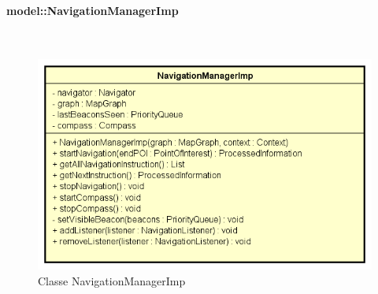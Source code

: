 \documentclass[../DefinizioneDiProdotto.tex]{subfiles}
\begin{document}
\paragraph{model::NavigationManagerImp}
\
\begin{figure}[H]
	\centering
	\includegraphics[width=\maxwidth]{img/NavigationManagerImp.png}
	\caption{Classe NavigationManagerImp}\label{fig:model::NavigationManagerImp} 
\end{figure}
\end{document}
